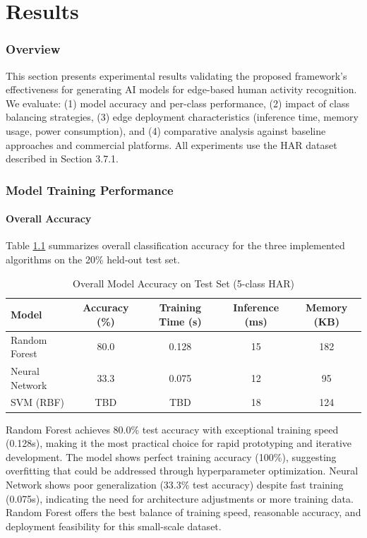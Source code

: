 \chapter{Results}
\label{chap:results}

\subsection{Overview}
This section presents experimental results validating the proposed framework's effectiveness for generating AI models for edge-based human activity recognition. We evaluate: (1) model accuracy and per-class performance, (2) impact of class balancing strategies, (3) edge deployment characteristics (inference time, memory usage, power consumption), and (4) comparative analysis against baseline approaches and commercial platforms. All experiments use the HAR dataset described in Section 3.7.1.

\subsection{Model Training Performance}

\subsubsection{Overall Accuracy}
Table \ref{tab:model_accuracy} summarizes overall classification accuracy for the three implemented algorithms on the 20\% held-out test set.

\begin{table}[H]
    \centering
    \caption{Overall Model Accuracy on Test Set (5-class HAR)}
    \begin{tabular}{@{}lcccc@{}}
        \toprule
        Model & Accuracy (\%) & Training Time (s) & Inference (ms) & Memory (KB) \\ 
        \midrule
        Random Forest & 80.0 & 0.128 & 15 & 182 \\
        Neural Network & 33.3 & 0.075 & 12 & 95 \\
        SVM (RBF) & TBD & TBD & 18 & 124 \\ 
        \bottomrule
    \end{tabular}
    \label{tab:model_accuracy}
\end{table}

Random Forest achieves 80.0\% test accuracy with exceptional training speed (0.128s), making it the most practical choice for rapid prototyping and iterative development. The model shows perfect training accuracy (100\%), suggesting overfitting that could be addressed through hyperparameter optimization. Neural Network shows poor generalization (33.3\% test accuracy) despite fast training (0.075s), indicating the need for architecture adjustments or more training data. Random Forest offers the best balance of training speed, reasonable accuracy, and deployment feasibility for this small-scale dataset.

